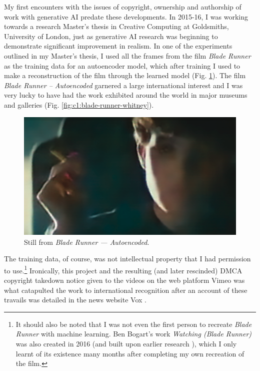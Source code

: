 My first encounters with the issues of copyright, ownership and authorship of work with generative AI predate these developments. 
In 2015-16, I was working towards a research Master's thesis in Creative Computing at Goldsmiths, University of London, just as generative AI research was beginning to demonstrate significant improvement in realism. 
In one of the experiments outlined in my Master's thesis, I used all the frames from the film \textit{Blade Runner} as the training data for an autoencoder model, which after training I used to make a reconstruction of the film through the learned model \citep{broad2016autoencoding}  (Fig. \ref{fig:c1:blade-runner}).
The film \textit{Blade Runner -- Autoencoded} garnered a large international interest and I was very lucky to have had the work exhibited around the world in major museums and galleries \citep{broad2017autoencoding}  (Fig. \ref{fig:c1:blade-runner-whitney}).

\begin{figure}[!htb]
    \centering
    \captionsetup{justification=centering}
    \includegraphics[width=1\textwidth]{figures/c1_intro/blade_runner_still.png}
    \caption{Still from \textit{Blade Runner --- Autoencoded}.}
    \label{fig:c1:blade-runner}
\end{figure}

The training data, of course, was not intellectual property that I had permission to use.\footnote{It should also be noted that I was not even the first person to recreate \textit{Blade Runner} with machine learning. Ben Bogart's work \textit{Watching (Blade Runner)} was also created in 2016 \citep{bogart2016watching} (and built upon earlier research \citep{bogart2008memory,bogart2013context}), which I only learnt of its existence many months after completing my own recreation of the film.}
Ironically, this project and the resulting (and later rescinded) DMCA copyright takedown notice given to the videos on the web platform Vimeo was what catapulted the work to international recognition after an account of these travails was detailed in the news website Vox \citep{romano2016bladerunner}.

